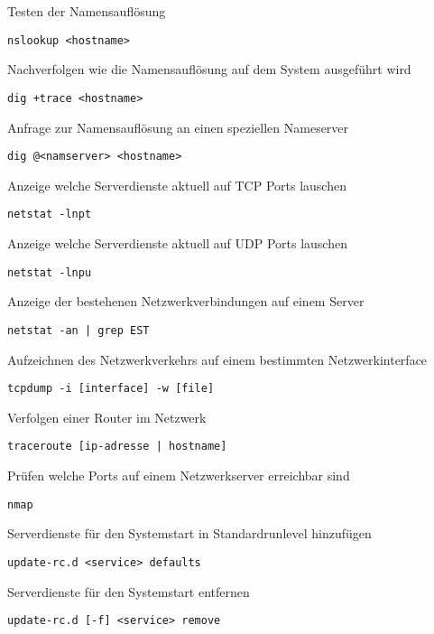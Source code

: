 Testen der Namensauflösung
\begin{lstlisting}
nslookup <hostname>
\end{lstlisting}

Nachverfolgen wie die Namensauflösung auf dem System ausgeführt wird
\begin{lstlisting}
dig +trace <hostname>
\end{lstlisting}

Anfrage zur Namensauflösung an einen speziellen Nameserver
\begin{lstlisting}
dig @<namserver> <hostname> 
\end{lstlisting}

Anzeige welche Serverdienste aktuell auf TCP Ports lauschen
\begin{lstlisting}
netstat -lnpt 
\end{lstlisting}

Anzeige welche Serverdienste aktuell auf UDP Ports lauschen
\begin{lstlisting}
netstat -lnpu 
\end{lstlisting}

Anzeige der bestehenen Netzwerkverbindungen auf einem Server
\begin{lstlisting}
netstat -an | grep EST 
\end{lstlisting}

Aufzeichnen des Netzwerkverkehrs auf einem bestimmten Netzwerkinterface
\begin{lstlisting}
tcpdump -i [interface] -w [file]
\end{lstlisting}

Verfolgen einer Router im Netzwerk
\begin{lstlisting}
traceroute [ip-adresse | hostname] 
\end{lstlisting}

Prüfen welche Ports auf einem Netzwerkserver erreichbar sind
\begin{lstlisting}
nmap 
\end{lstlisting}

Serverdienste für den Systemstart in Standardrunlevel hinzufügen
\begin{lstlisting}
update-rc.d <service> defaults 
\end{lstlisting}

Serverdienste für den Systemstart entfernen
\begin{lstlisting}
update-rc.d [-f] <service> remove
\end{lstlisting}

